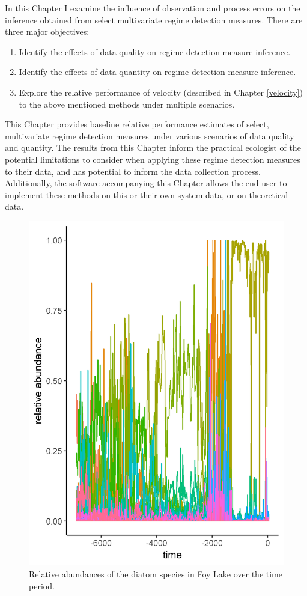 \documentclass[print]{nuthesis}
\begin{document}
In this Chapter I examine the influence of observation and process errors on the inference obtained from select multivariate regime detection measures. There are three major objectives:
\begin{enumerate}
\def\labelenumi{\arabic{enumi}.}
\tightlist
\item
  Identify the effects of data quality on regime detection measure inference.
\item
  Identify the effects of data quantity on regime detection measure inference.
\item
  Explore the relative performance of velocity (described in Chapter \ref{velocity}) to the above mentioned methods under multiple scenarios.
\end{enumerate}
This Chapter provides baseline relative performance estimates of select, multivariate regime detection measures under various scenarios of data quality and quantity. The results from this Chapter inform the practical ecologist of the potential limitations to consider when applying these regime detection measures to their data, and has potential to inform the data collection process. Additionally, the software accompanying this Chapter allows the end user to implement these methods on this or their own system data, or on theoretical data.
\begin{figure}
\includegraphics[width=0.85\linewidth]{./chapterFiles/resampling/figsCalledInDiss/origDataRelAbundance} \caption{Relative abundances of the diatom species in Foy Lake over the time period.}\label{fig:origDat}
\end{figure}
\end{document}
